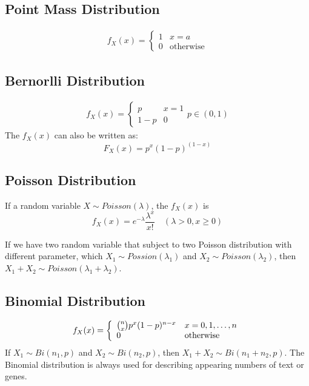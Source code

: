 	\subsection{Point Mass Distribution}
		\begin{eqnarray}
			f_X(x)=\left\{
			\begin{array}{ll}
				1 & x=a \\
				0 & \text{otherwise}
			\end{array}
			\right.
		\end{eqnarray}
	\subsection{Bernorlli Distribution}
		\begin{eqnarray}
			f_X(x)=\left\{
			\begin{array}{ll}
				p & x=1\\
				1-p & 0
			\end{array}
			\right. p\in(0,1)
		\end{eqnarray}
	The $f_X(x)$ can also be written as:
	$$F_X(x)=p^x(1-p)^{(1-x)}$$
	\subsection{Poisson Distribution}
	If a random variable $X\sim Poisson(\lambda)$, the $f_X(x)$ is
	$$f_X(x)=e^{-\lambda}\frac{\lambda^x}{x!}\quad (\lambda>0, x\geq0)$$
	
	If we have two random variable that subject to two Poisson distribution with different parameter, which $X_1\sim Possion(\lambda_1)$ and $X_2\sim Poisson(\lambda_2)$, then $X_1 +X_2 \sim Poisson (\lambda_1 + \lambda_2)$.
	
	\subsection{Binomial Distribution}
		\begin{eqnarray}
			f_X(x)=\left\{
				\begin{array}{ll}
					\tbinom{n}{x}p^x(1-p)^{n-x} & x = 0,1,\dots,n\\
					0 & \text{otherwise}
				\end{array}
			\right.
		\end{eqnarray}
	If $X_1\sim Bi(n_1, p)$ and $X_2 \sim Bi(n_2, p)$, then $X_1+X_2\sim Bi(n_1+n_2, p)$. The Binomial distribution is always used for describing appearing numbers  of text or genes.
	

